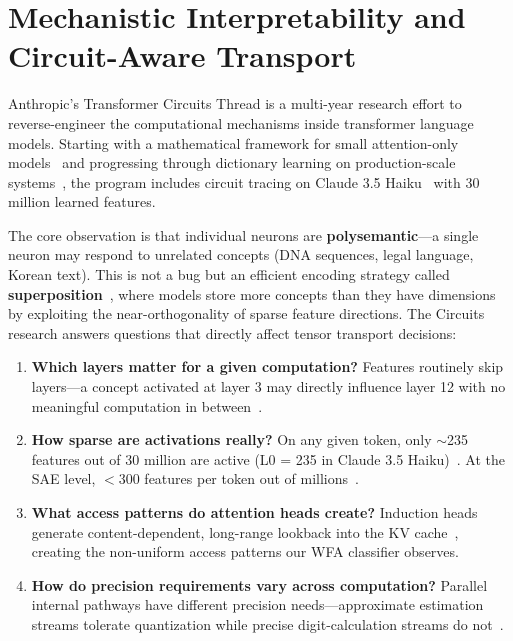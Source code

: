 \documentclass[11pt,letterpaper]{article}
\theoremstyle{definition}
\begin{document}
\section{Mechanistic Interpretability and Circuit-Aware Transport}
\label{sec:circuits}

Anthropic's Transformer Circuits Thread is a multi-year research effort to reverse-engineer the computational mechanisms inside transformer language models. Starting with a mathematical framework for small attention-only models~\cite{elhage2021framework} and progressing through dictionary learning on production-scale systems~\cite{templeton2024scaling}, the program includes circuit tracing on Claude 3.5 Haiku~\cite{lindsey2025biology} with 30 million learned features.

The core observation is that individual neurons are \textbf{polysemantic}---a single neuron may respond to unrelated concepts (DNA sequences, legal language, Korean text). This is not a bug but an efficient encoding strategy called \textbf{superposition}~\cite{elhage2022superposition}, where models store more concepts than they have dimensions by exploiting the near-orthogonality of sparse feature directions. The Circuits research answers questions that directly affect tensor transport decisions:

\begin{enumerate}
    \item \textbf{Which layers matter for a given computation?} Features routinely skip layers---a concept activated at layer 3 may directly influence layer 12 with no meaningful computation in between~\cite{ameisen2025tracing}.
    \item \textbf{How sparse are activations really?} On any given token, only $\sim$235 features out of 30 million are active (L0 = 235 in Claude 3.5 Haiku)~\cite{lindsey2025biology}. At the SAE level, $<$300 features per token out of millions~\cite{templeton2024scaling}.
    \item \textbf{What access patterns do attention heads create?} Induction heads generate content-dependent, long-range lookback into the KV cache~\cite{olsson2022induction}, creating the non-uniform access patterns our WFA classifier observes.
    \item \textbf{How do precision requirements vary across computation?} Parallel internal pathways have different precision needs---approximate estimation streams tolerate quantization while precise digit-calculation streams do not~\cite{lindsey2025biology}.
\end{enumerate}
\end{document}
